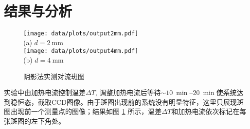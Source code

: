 \documentclass[aps,pre,12pt,preprint,%
	onecolumn,showpacs,showkeys,nofootinbib]{revtex4-1}
\begin{document}
\section{结果与分析}
%
%
\vspace{-1\baselineskip}
	\begin{figure}[!ht]
	\newcommand{\figwidth}{\linewidth}
	\newcommand{\captionsep}{.5ex}
	\centering\small
	\texttt{[image: data/plots/output2mm.pdf]}\\[\captionsep]
	(a) $d = \SI{2}{\mm}$\\[2ex]
	\texttt{[image: data/plots/output4mm.pdf]}\\[\captionsep]
	(b) $d = \SI{4}{\mm}$\\[0ex]
	\caption{阴影法实测对流斑图}
	\vspace{-1\baselineskip}
	\label{fig:convectionPatterns}
	\end{figure}
\FloatBarrier
	
	实验中由加热电流控制温差$\Delta T$, 调整加热电流后等待$\sim\SIrange{10}{20}{\min}$使系统达到稳恒态，截取CCD图像。由于斑图出现前的系统没有明显特征，这里只展现斑图出现前一个测量点的图像；结果如图 \ref{fig:convectionPatterns} 所示，温差$\Delta T$和加热电流依次标记在每张斑图的左下角处。
	
\end{document}
